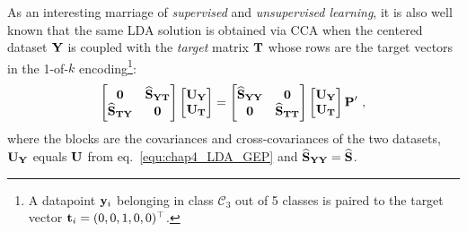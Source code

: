      As an interesting marriage of \textit{supervised} and \textit{unsupervised learning}, it is also well known that the same LDA solution is obtained via CCA \citep{DeBie:eigenproblems05, Bach:kica02, Sun:cca11} when the centered dataset $\mathbf{Y}$ is coupled with the \textit{target} matrix $\mathbf{T}$ whose rows are the target vectors in the 1-of-$k$ encoding\footnote{ A datapoint $\mathbf{y}_i$ belonging in class $\mathcal{C}_3$ out of 5 classes is paired to the target vector $\mathbf{t}_i = (0,0,1,0,0)^\top$.}:
      \begin{equation} \label{equ:chap4_LDA_asCCA_GEP}
	\begin{bmatrix}  \mathbf{0} & \widehat{\mathbf{S}}_{\mathbf{Y}\mathbf{T}} \\ \widehat{\mathbf{S}}_{\mathbf{T}\mathbf{Y}} & \mathbf{0}  \end{bmatrix} \begin{bmatrix}  \mathbf{U}_{\mathbf{Y}} \\ \mathbf{U}_{\mathbf{T}}  \end{bmatrix}
	= \begin{bmatrix}  \widehat{\mathbf{S}}_{\mathbf{Y}\mathbf{Y}} &\mathbf{0} \\ \mathbf{0} &\widehat{\mathbf{S}}_{\mathbf{T}\mathbf{T}}  \end{bmatrix} \begin{bmatrix}  \mathbf{U}_{\mathbf{Y}} \\ \mathbf{U}_{\mathbf{T}}  \end{bmatrix} \mathbf{P}^\prime ~,
      \end{equation}
      where the blocks are the covariances and cross-covariances of the two datasets, $\mathbf{U}_{\mathbf{Y}}$ equals $\mathbf{U}$ from eq.~\eqref{equ:chap4_LDA_GEP} and $\widehat{\mathbf{S}}_{\mathbf{Y}\mathbf{Y}} = \widehat{\mathbf{S}}$.

